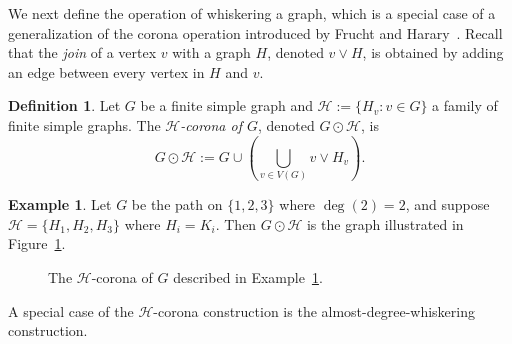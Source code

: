 \documentclass[12pt]{amsart}
\newcommand{\vertex}{\node[vertex]}
\theoremstyle{definition}
\newtheorem{definition}[theorem]{Definition}
\newtheorem{example}[theorem]{Example}
\begin{document}
We next define the operation of whiskering a graph, which is a special case of a generalization of the corona operation introduced by Frucht and Harary~\cite{fruchthararycorona}.
Recall that the \emph{join} of a vertex $v$ with a graph $H$, denoted $v\vee H$, is obtained by adding an edge between every vertex in $H$ and $v$.

\begin{definition}
Let $G$ be a finite simple graph and $\mathcal{H}:=\{H_v:v\in G\}$ a family of finite simple graphs.
The \emph{$\mathcal{H}$-corona of $G$}, denoted $G\odot \mathcal{H}$, is
\[
    G\odot \mathcal{H} := G \cup \left(\bigcup_{v \in V(G)} v \vee H_v\right).
\]
\end{definition}


\begin{example}\label{ex: H-corona}
    Let $G$ be the path on $\{1,2,3\}$ where $\deg(2) = 2$, and suppose $\mathcal{H} = \{H_1,H_2,H_3\}$ where $H_i = K_i$. 
    Then $G \odot \mathcal{H}$ is the graph illustrated in Figure~\ref{fig: H-corona}.
\end{example}

\begin{figure}[ht]
    \begin{center}
\end{center}
    \caption{The $\mathcal{H}$-corona of $G$ described in Example~\ref{ex: H-corona}.}
    \label{fig: H-corona}
\end{figure}

A special case of the $\mathcal{H}$-corona construction is the almost-degree-whiskering construction.
\end{document}
